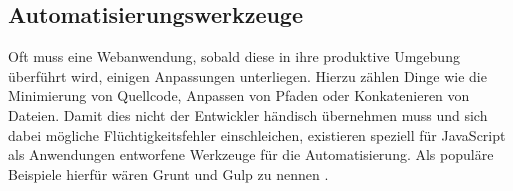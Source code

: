 \subsection{Automatisierungswerkzeuge}
\label{sec:automatiserungswerkzeuge}
Oft muss eine Webanwendung, sobald diese in ihre produktive Umgebung überführt wird, einigen Anpassungen unterliegen. Hierzu zählen Dinge wie die Minimierung von Quellcode, Anpassen von Pfaden oder Konkatenieren von Dateien. Damit dies nicht der Entwickler händisch übernehmen muss und sich dabei mögliche Flüchtigkeitsfehler einschleichen, existieren speziell für JavaScript als Anwendungen entworfene Werkzeuge für die Automatisierung. Als populäre Beispiele hierfür wären Grunt \cite{gruntjs.com} und Gulp \cite{gulpjs.com} zu nennen \cite[S. 246 f.]{ste15}.